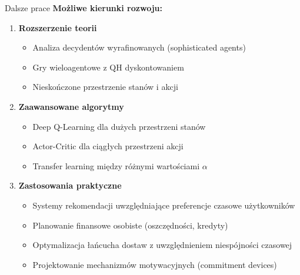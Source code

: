 \begin{frame}{Dalsze prace}
\textbf{Możliwe kierunki rozwoju:}

\begin{enumerate}
    \item \textbf{Rozszerzenie teorii}
    \begin{itemize}
        \item Analiza decydentów wyrafinowanych (sophisticated agents)
        \item Gry wieloagentowe z QH dyskontowaniem
        \item Nieskończone przestrzenie stanów i akcji
    \end{itemize}
    
    \vspace{0.5em}
    \item \textbf{Zaawansowane algorytmy}
    \begin{itemize}
        \item Deep Q-Learning dla dużych przestrzeni stanów
        \item Actor-Critic dla ciągłych przestrzeni akcji
        \item Transfer learning między różnymi wartościami $\alpha$
    \end{itemize}
    
    \vspace{0.5em}
    \item \textbf{Zastosowania praktyczne}
    \begin{itemize}
        \item Systemy rekomendacji uwzględniające preferencje czasowe użytkowników
        \item Planowanie finansowe osobiste (oszczędności, kredyty)
        \item Optymalizacja łańcucha dostaw z uwzględnieniem niespójności czasowej
        \item Projektowanie mechanizmów motywacyjnych (commitment devices)
    \end{itemize}
\end{enumerate}
\end{frame}

